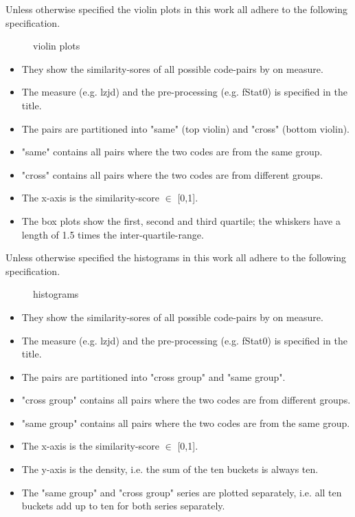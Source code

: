 \documentclass[../main.tex]{subfiles}
\begin{document}
Unless otherwise specified the violin plots  in this work all adhere to the following specification.

\begin{figure}[ht!]
  \centering

  \caption{violin plots}
  \label{fig:violins}
\end{figure}

\begin{itemize}
  \item They show the similarity-sores of all possible code-pairs by on measure.
  \item The measure (e.g. lzjd) and the pre-processing (e.g. fStat0) is specified in the title.
  \item The pairs are partitioned into "same" (top violin) and "cross" (bottom violin).
  \item "same" contains all pairs where the two codes are from the same group.
  \item "cross" contains all pairs where the two codes are from different groups.
  \item The x-axis is the similarity-score \(\in\) [0,1].
  \item The box plots show the first, second and third quartile; the whiskers have a length of 1.5 times the inter-quartile-range.
\end{itemize}

Unless otherwise specified the histograms  in this work all adhere to the following specification.

\begin{figure}[ht!]
  \centering

  \caption{histograms}
  \label{fig:histograms}
\end{figure}

\begin{itemize}
  \item They show the similarity-sores of all possible code-pairs by on measure.
  \item The measure (e.g. lzjd) and the pre-processing (e.g. fStat0) is specified in the title.
  \item The pairs are partitioned into "cross group" and "same group".
  \item "cross group" contains all pairs where the two codes are from different groups.
  \item "same group" contains all pairs where the two codes are from the same group.
  \item The x-axis is the similarity-score \(\in\) [0,1].
  \item The y-axis is the density, i.e. the sum of the ten buckets is always ten.
  \item The "same group" and "cross group" series are plotted separately, i.e. all ten buckets add up to ten for both series separately.
\end{itemize}
\end{document}
